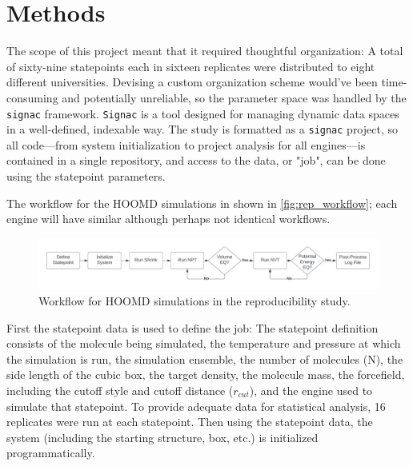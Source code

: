 \section{Methods}

The scope of this project meant that it required thoughtful organization: A total of sixty-nine statepoints each in sixteen replicates were distributed to eight different universities.
Devising a custom organization scheme would've been time-consuming and potentially unreliable, so the parameter space was handled by the \texttt{signac} framework\cite{Adorf2018, signac_zenodo, signac_scipy_2018, signac_scipy_2021}.
\texttt{Signac} is a tool designed for managing dynamic data spaces in a well-defined, indexable way.
The study is formatted as a \texttt{signac} project, so all code---from system initialization to project analysis for all engines---is contained in a single repository, and access to the data, or "job", can be done using the statepoint parameters.

The workflow for the HOOMD simulations in shown in \autoref{fig:rep_workflow}; each engine will have similar although perhaps not identical workflows.
\begin{figure}[h!]
    \centering
    \includegraphics[width=\linewidth,keepaspectratio]{figures/rep_study/reproducibility_workflow.png}
    \caption{Workflow for HOOMD simulations in the reproducibility study.}\label{fig:rep_workflow}
\end{figure}
First the statepoint data is used to define the job: The statepoint definition consists of the molecule being simulated, the temperature and pressure at which the simulation is run, the simulation ensemble, the number of molecules (N), the side length of the cubic box, the target density, the molecule mass, the forcefield, including the cutoff style and cutoff distance ($r_{cut}$), and the engine used to simulate that statepoint. 
To provide adequate data for statistical analysis, 16 replicates were run at each statepoint.
Then using the statepoint data, the system (including the starting structure, box, etc.) is initialized programmatically.

